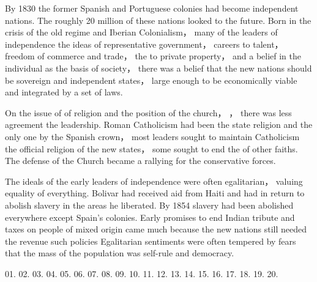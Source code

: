 \qquad By 1830 the former Spanish and Portuguese colonies had become independent nations. The roughly 20 million   \underline{\quad}   of these nations looked   \underline{\quad}   to the future. Born in the crisis of the old regime and Iberian Colonialism， many of the leaders of independence   \underline{\quad}   the ideas of representative government， careers   \underline{\quad}   to talent， freedom of commerce and trade， the   \underline{\quad}   to private property， and a belief in the individual as the basis of society， \underline{\quad}  there was a belief that the new nations should be sovereign and independent states， large enough to be economically viable and integrated by a   \underline{\quad}  set of laws.

\qquad On the issue of   \underline{\quad}   of religion and the position of the church，  \underline{\quad}  ， there was less agreement   \underline{\quad}   the leadership. Roman Catholicism had been the state religion and the only one   \underline{\quad}  by the Spanish crown，  \underline{\quad}  most leaders sought to maintain Catholicism   \underline{\quad}   the official religion of the new states， some sought to end the   \underline{\quad}  of other faiths. The defense of the Church became a rallying   \underline{\quad}   for the conservative forces.

\qquad The ideals of the early leaders of independence were often egalitarian， valuing equality of everything. Bolivar had received aid from Haiti and had  \underline{\quad}  in return to abolish slavery in the areas he liberated. By 1854 slavery had been abolished everywhere except Spain's   \underline{\quad}   colonies. Early promises to end Indian tribute and taxes on people of mixed origin came much   \underline{\quad}   because the new nations still needed the revenue such policies   \underline{\quad}   Egalitarian sentiments were often tempered by fears that the mass of the population was   \underline{\quad}   self-rule and democracy.

01. 
02. 
03. 
04. 
05. 
06. 
07. 
08. 
09. 
10. 
11. 
12. 
13. 
14. 
15. 
16. 
17. 
18. 
19. 
20. 